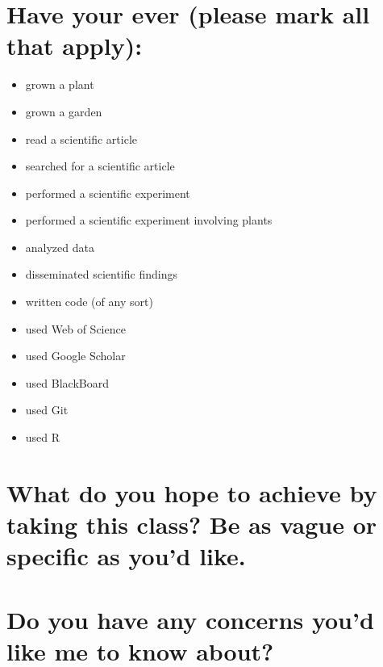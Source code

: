 \documentclass[12pt, notitlepage]{article}   	%
\def\wl{\par \vspace{\baselineskip}}
\begin{document}
{\newpage

\section{Have your ever (please mark all that apply):}
\begin{itemize}
	\item{grown a plant \underline{\hspace{1cm}}}
	\item{grown a garden \underline{\hspace{1cm}}}
	\item{read a scientific article \underline{\hspace{1cm}}}
	\item{searched for a scientific article \underline{\hspace{1cm}}}
	\item{performed a scientific experiment \underline{\hspace{1cm}}}
	\item{performed a scientific experiment involving plants \underline{\hspace{1cm}}}
	\item{analyzed data \underline{\hspace{1cm}}}
	\item{disseminated scientific findings \underline{\hspace{1cm}}}
	\item{written code (of any sort) \underline{\hspace{1cm}}}
	\item{used Web of Science \underline{\hspace{1cm}}}
	\item{used Google Scholar \underline{\hspace{1cm}}}
	\item{used BlackBoard \underline{\hspace{1cm}}}
	\item{used Git \underline{\hspace{1cm}}}
	\item{used R \underline{\hspace{1cm}}}
\end{itemize}

\newpage

\section{What do you hope to achieve by taking this class? 
Be as vague or specific as you'd like.}

\wl
\wl
\wl
\wl
\wl
\wl
\wl
\wl
\wl
\wl
\wl
\wl

\section{Do you have any concerns you'd like me to know about?}

} %
\end{document}
